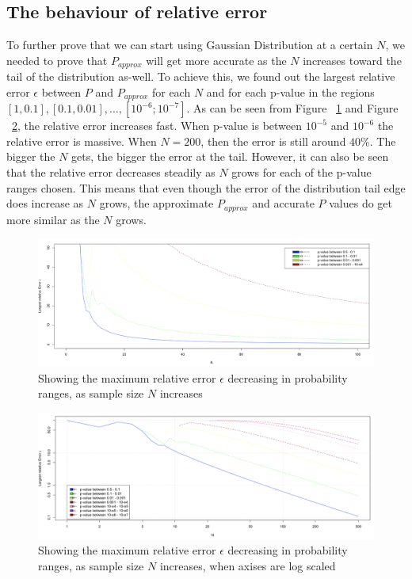 \documentclass[12pt]{article}
\begin{document}
{\subsection{The behaviour of relative error}
To further prove that we can start using Gaussian Distribution at a certain $N$, we needed to prove that $P_{approx}$ will get more accurate as the $N$ increases toward the tail of the distribution as-well. To achieve this, we found out the largest relative error $\epsilon$ between $P$ and $P_{approx}$ for each $N$ and for each p-value in the regions $[1, 0.1], [0.1, 0.01], ... , [10^{-6};10^{-7}]$. As can be seen from Figure ~\ref{fig:LargestApproxPRelativeError0_100} and Figure ~\ref{fig:LargestApproxPRelativeError100_500}, the relative error increases fast. When p-value is between $10^{-5}$ and $10^{-6}$ the relative error is massive. When $N=200$, then the error is still around $40\%$. The bigger the $N$ gets, the bigger the error at the tail. However, it can also be seen that the relative error decreases steadily as $N$ grows for each of the p-value ranges chosen. This means that even though the error of the distribution tail edge does increase as $N$ grows, the approximate $P_{approx}$ and accurate $P$ values do get more similar as the $N$ grows.

\begin{figure}[H]
  \centering
  \includegraphics[width=1\textwidth]{LargestApproxPRelativeError0_100}
  \caption{Showing the maximum relative error $\epsilon$ decreasing in probability ranges, as sample size $N$ increases}
  \label{fig:LargestApproxPRelativeError0_100}
\end{figure}

\begin{figure}[H]
  \centering
  \includegraphics[width=1\textwidth]{LargestApproxPRelativeError100_500}
  \caption{Showing the maximum relative error $\epsilon$ decreasing in probability ranges, as sample size $N$ increases, when axises are log scaled}
  \label{fig:LargestApproxPRelativeError100_500}
\end{figure}

}
\end{document}
